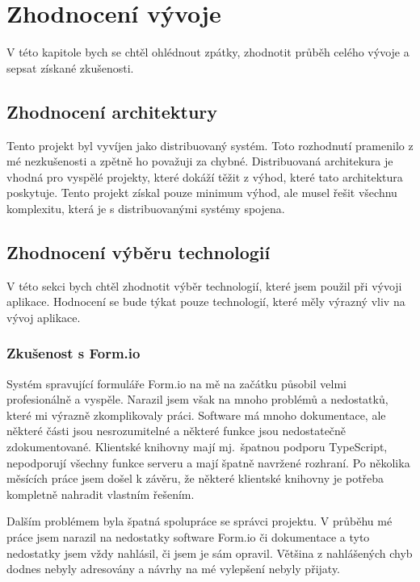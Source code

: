 \chapter{Zhodnocení vývoje}\label{ch:zhodnoceni-vyvoje}

V této kapitole bych se chtěl ohlédnout zpátky, zhodnotit průběh celého vývoje a sepsat získané zkušenosti.


\section{Zhodnocení architektury}\label{sec:zhodnoceni-architektury}

Tento projekt byl vyvíjen jako distribuovaný systém.
Toto rozhodnutí pramenilo z mé nezkušenosti a zpětně ho považuji za chybné.
Distribuovaná architekura je vhodná pro vyspělé projekty, které dokáží těžit z výhod, které tato architektura poskytuje.
Tento projekt získal pouze minimum výhod, ale musel řešit všechnu komplexitu, která je s distribuovanými systémy spojena.


\section{Zhodnocení výběru technologií}\label{sec:vyber-technologii-zaver}

V této sekci bych chtěl zhodnotit výběr technologií, které jsem použil při vývoji aplikace.
Hodnocení se bude týkat pouze technologií, které měly výrazný vliv na vývoj aplikace.

\subsection{Zkušenost s Form.io}\label{subsec:zkusenost-s-formio}

Systém spravující formuláře Form.io na mě na začátku působil velmi profesionálně a vyspěle.
Narazil jsem však na mnoho problémů a nedostatků, které mi výrazně zkomplikovaly práci.
Software má mnoho dokumentace, ale některé části jsou nesrozumitelné a některé funkce jsou nedostatečně zdokumentované.
Klientské knihovny mají mj.\ špatnou podporu TypeScript, nepodporují všechny funkce serveru a mají špatně navržené rozhraní.
Po několika měsících práce jsem došel k závěru, že některé klientské knihovny je potřeba kompletně nahradit vlastním řešením.

Dalším problémem byla špatná spolupráce se správci projektu.
V průběhu mé práce jsem narazil na nedostatky software Form.io či dokumentace a tyto nedostatky jsem vždy nahlásil, či jsem je sám opravil.
Většina z nahlášených chyb dodnes nebyly adresovány a návrhy na mé vylepšení nebyly přijaty.

